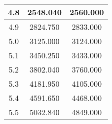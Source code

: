 \begin{table}[h!]
\begin{tabular}{|c|c|c|}
        4.8        & 2548.040       & 2560.000                          \\ \hline
        4.9        & 2824.750       & 2833.000                          \\ \hline
        5.0        & 3125.000       & 3124.000                          \\ \hline
        5.1        & 3450.250       & 3433.000                          \\ \hline
        5.2        & 3802.040       & 3760.000                          \\ \hline
        5.3        & 4181.950       & 4105.000                          \\ \hline
        5.4        & 4591.650       & 4468.000                          \\ \hline
        5.5        & 5032.840       & 4849.000                          \\ \hline
    \end{tabular}\label{tab:table2}
\end{table}
